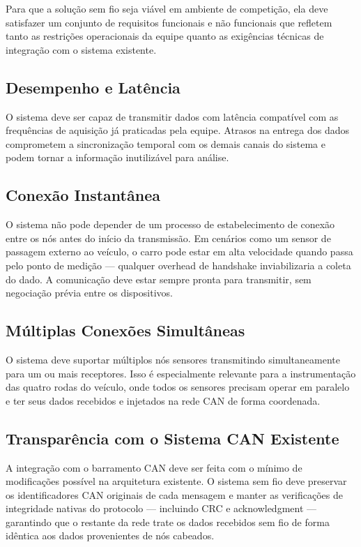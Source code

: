 \documentclass{article}
\begin{document}
    Para que a solução sem fio seja viável em ambiente de competição, ela deve
    satisfazer um conjunto de requisitos funcionais e não funcionais que
    refletem tanto as restrições operacionais da equipe quanto as exigências
    técnicas de integração com o sistema existente.

    \subsection{Desempenho e Latência}

    O sistema deve ser capaz de transmitir dados com latência compatível com as frequências
    de aquisição já praticadas pela equipe. Atrasos na entrega dos dados
    comprometem a sincronização temporal com os demais canais do sistema e podem
    tornar a informação inutilizável para análise.

    \subsection{Conexão Instantânea}

    O sistema não pode depender de um processo de estabelecimento de conexão entre
    os nós antes do início da transmissão. Em cenários como um sensor de
    passagem externo ao veículo, o carro pode estar em alta velocidade quando passa
    pelo ponto de medição — qualquer overhead de handshake inviabilizaria a coleta
    do dado. A comunicação deve estar sempre pronta para transmitir, sem negociação
    prévia entre os dispositivos.

    \subsection{Múltiplas Conexões Simultâneas}

    O sistema deve suportar múltiplos nós sensores transmitindo simultaneamente
    para um ou mais receptores. Isso é especialmente relevante para a instrumentação
    das quatro rodas do veículo, onde todos os sensores precisam operar em
    paralelo e ter seus dados recebidos e injetados na rede CAN de forma
    coordenada.

    \subsection{Transparência com o Sistema CAN Existente}

    A integração com o barramento CAN deve ser feita com o mínimo de modificações
    possível na arquitetura existente. O sistema sem fio deve preservar os
    identificadores CAN originais de cada mensagem e manter as verificações de
    integridade nativas do protocolo — incluindo CRC e acknowledgment —
    garantindo que o restante da rede trate os dados recebidos sem fio de forma
    idêntica aos dados provenientes de nós cabeados.
\end{document}

